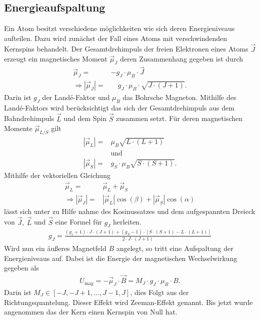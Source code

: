 \subsection{Energieaufspaltung}
Ein Atom besitzt verschiedene möglichkeiten wie sich deren Energieniveaus aufteilen. Dazu wird zunächst der Fall eines Atoms mit verschwindenden Kernspins behandelt.
Der Gesamtdrehimpuls der freien Elektronen eines Atoms $\vec{J}$ erzeugt ein magnetisches Moment $\vec{\mu}_J $ deren Zusammenhang gegeben ist durch
\begin{align}
	\vec{\mu}_J=&-g_J \cdot \mu_B \cdot \vec{J}\\
	\Rightarrow |\vec{\mu}_J|=&\hspace{1em} g_J\cdot\mu_B\cdot\sqrt{J\cdot(J+1)}.
\end{align}
Darin ist $g_J$ der Landé-Faktor und $\mu_B$ das Bohrsche Magneton.
Mithilfe des Landé-Faktors wird berücksichtigt das sich der Gesamtdrehimpuls aus dem Bahndrehimpuls $\vec{L}$ und dem Spin $\vec{S}$ zusammen setzt.
Für deren magnetischen Momente $\vec{\mu}_{L/S}$ gilt 
\begin{align}
	|\vec{\mu}_L|=&\mu_B\sqrt{L\cdot(L+1)}\\
	&\text{und}\nonumber\\
	|\vec{\mu}_S|=& g_S\cdot\mu_B\sqrt{S\cdot(S+1)}.
\end{align}
Mithilfe der vektoriellen Gleichung
\begin{align}
	\vec{\mu}_L=&\vec{\mu}_L+\vec{\mu}_S\\
	\Rightarrow |\vec{\mu}_J|=&|\vec{\mu}_L|\cos(\beta)+|\vec{\mu}_S|\cos(\alpha)
\end{align}
lässt sich unter zu Hilfe nahme des Kosinussatzes und dem aufgespannten Dreieck von $\vec{J},\ \vec{L}$ und $\vec{S}$ eine Formel für $g_J$ herleiten.
\begin{align}
	g_J =\frac{(g_s + 1)\cdot J \cdot (J+1)+(g_S-1)\cdot\left[S\cdot(S+1)-L\cdot(L+1)\right]}{2\cdot J \cdot (J+1)}
\end{align}
Wird nun ein äußeres Magnetfeld $B$ angelegt, so tritt eine Aufspaltung der Energieniveaus auf.
Dabei ist die Energie der magnetischen Wechselwirkung gegeben als 
\begin{align}
	U_{\text{mag}}=-\vec{\mu}_J\cdot \vec{B}=M_J\cdot g_J\cdot \mu_B\cdot B.\label{eq:magEnergie}
\end{align}
Darin ist $M_J\in[-J, -J+1,\hdots,J-1,J]$, dies Folgt aus der Richtungsquantelung.
Dieser Effekt wird Zeeman-Effekt genannt.
Bis jetzt wurde angenommen das der Kern einen Kernspin von Null hat.
